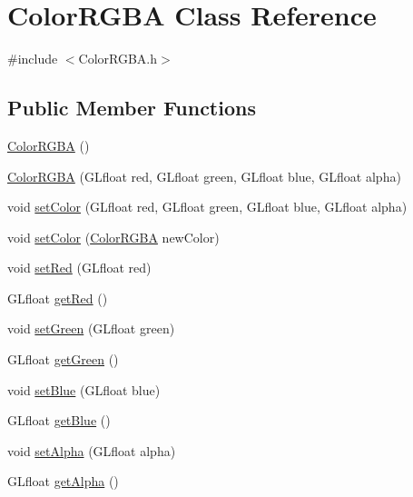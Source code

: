 \hypertarget{class_color_r_g_b_a}{}\section{Color\+R\+G\+B\+A Class Reference}
\label{class_color_r_g_b_a}


{\ttfamily \#include $<$Color\+R\+G\+B\+A.\+h$>$}

\subsection*{Public Member Functions}
\begin{DoxyCompactItemize}
\item 
\hyperlink{class_color_r_g_b_a_aeb006fd2a96986423ac6f35aa6d975f6}{Color\+R\+G\+B\+A} ()
\item 
\hyperlink{class_color_r_g_b_a_ad89bbba883f747bffc326812bdc1332c}{Color\+R\+G\+B\+A} (G\+Lfloat red, G\+Lfloat green, G\+Lfloat blue, G\+Lfloat alpha)
\item 
void \hyperlink{class_color_r_g_b_a_a76f2f4e38f975f9389390180ffd33c75}{set\+Color} (G\+Lfloat red, G\+Lfloat green, G\+Lfloat blue, G\+Lfloat alpha)
\item 
void \hyperlink{class_color_r_g_b_a_a23c142b9edfc3209ba5d8b107564ed63}{set\+Color} (\hyperlink{class_color_r_g_b_a}{Color\+R\+G\+B\+A} new\+Color)
\item 
void \hyperlink{class_color_r_g_b_a_aa89321867bc54276a32a075df7bfc941}{set\+Red} (G\+Lfloat red)
\item 
G\+Lfloat \hyperlink{class_color_r_g_b_a_a84eb325397f8253beb04f0766e00c6d8}{get\+Red} ()
\item 
void \hyperlink{class_color_r_g_b_a_a246a8741af2a6877fc2cf3b2d7558f07}{set\+Green} (G\+Lfloat green)
\item 
G\+Lfloat \hyperlink{class_color_r_g_b_a_a337699dcfc081d67a7fc760a31e0cafa}{get\+Green} ()
\item 
void \hyperlink{class_color_r_g_b_a_a23fbd326b3a65240afdad9de28253627}{set\+Blue} (G\+Lfloat blue)
\item 
G\+Lfloat \hyperlink{class_color_r_g_b_a_adcc5ca8f75209f1ff0b73bfc686b6336}{get\+Blue} ()
\item 
void \hyperlink{class_color_r_g_b_a_a45c53cfb2b2d1098caeaefa03e56aa2e}{set\+Alpha} (G\+Lfloat alpha)
\item 
G\+Lfloat \hyperlink{class_color_r_g_b_a_a726c1804deae2b611d3019ae769d7bbd}{get\+Alpha} ()
\end{DoxyCompactItemize}


